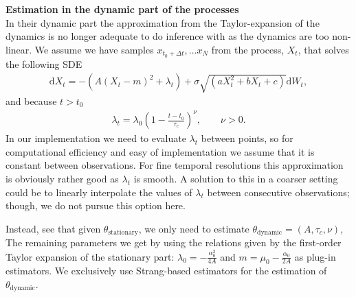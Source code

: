 \textbf{Estimation in the dynamic part of the processes}\\
In their dynamic part the approximation from the Taylor-expansion of the dynamics is no longer adequate to do inference with as the dynamics are too non-linear. We assume we have samples $x_{t_0+\Delta t}, \dots x_{N}$ from the process, $X_t$, that solves the following SDE
\begin{align}
    \mathrm{d}X_t = -\left(A(X_t - m)^2 + \lambda_t\right) + \sigma\sqrt{\left(aX_t^2 + bX_t + c\right)}\mathrm{d}W_t, 
\end{align}
and because $t>t_0$
\begin{align}
    \lambda_t = \lambda_0\left(1 - \frac{t - t_0}{\tau_c}\right)^\nu, \qquad \nu >0.
\end{align} 
In our implementation we need to evaluate $\lambda_t$ between points, so for computational efficiency and easy of implementation we assume that it is constant between observations. For fine temporal resolutions this approximation is obviously rather good as $\lambda_t$ is smooth. A solution to this in a coarser setting could be to linearly interpolate the values of $\lambda_t$ between consecutive observations; though, we do not pursue this option here. 

Instead, see that given $\theta_{\mathrm{stationary}}$, we only need to estimate $\theta_{\mathrm{dynamic}} = (A, \tau_c, \nu)$, The remaining parameters we get by using the relations given by the first-order Taylor expansion of the stationary part: $\lambda_0 = -\frac{\alpha_0^2}{4A}$ and $m = \mu_0 - \frac{\alpha_0}{2A}$ as plug-in estimators. We exclusively use Strang-based estimators for the estimation of $\theta_{\mathrm{dynamic}}$. 
